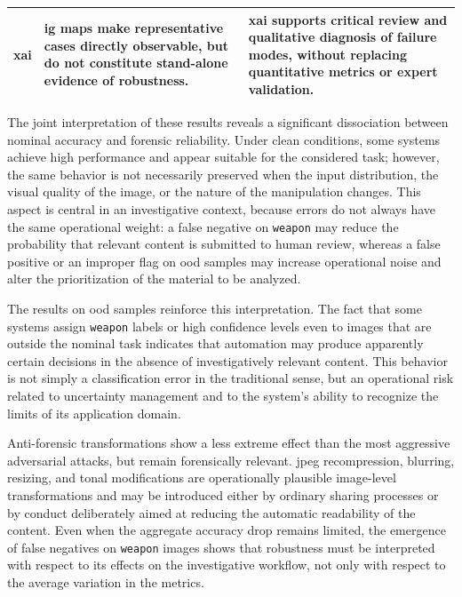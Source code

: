 \begin{table}[H]
\begin{tabularx}{\textwidth}{@{}p{} X X@{}}
\gls{xai}
& \gls{ig} maps make representative cases directly observable, but do not
  constitute stand-alone evidence of robustness.
& \gls{xai} supports critical review and qualitative diagnosis of failure modes,
  without replacing quantitative metrics or expert validation. \\
\bottomrule
\end{tabularx}
\end{table}

The joint interpretation of these results reveals a significant dissociation
between nominal accuracy and forensic reliability. Under clean conditions, some
systems achieve high performance and appear suitable for the considered task;
however, the same behavior is not necessarily preserved when the input
distribution, the visual quality of the image, or the nature of the manipulation
changes. This aspect is central in an investigative context, because errors do
not always have the same operational weight: a false negative on
\texttt{weapon} may reduce the probability that relevant content is submitted to
human review, whereas a false positive or an improper flag on \gls{ood} samples
may increase operational noise and alter the prioritization of the material to
be analyzed.

The results on \gls{ood} samples reinforce this interpretation. The fact that
some systems assign \texttt{weapon} labels or high confidence levels even to
images that are outside the nominal task indicates that automation may produce
apparently certain decisions in the absence of investigatively relevant content.
This behavior is not simply a classification error in the traditional sense,
but an operational risk related to uncertainty management and to the system's
ability to recognize the limits of its application domain.

Anti-forensic transformations show a less extreme effect than the most
aggressive adversarial attacks, but remain forensically relevant. \gls{jpeg}
recompression, blurring, resizing, and tonal modifications are operationally
plausible image-level transformations and may be introduced either by ordinary
sharing processes or by conduct deliberately aimed at reducing the automatic
readability of the content. Even when the aggregate accuracy drop remains
limited, the emergence of false negatives on \texttt{weapon} images shows that
robustness must be interpreted with respect to its effects on the investigative
workflow, not only with respect to the average variation in the metrics.

